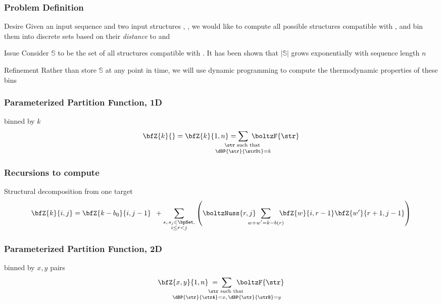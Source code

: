 \documentclass{beamer}
\begin{document}
\begin{frame}
	\frametitle{Problem Definition}
	\begin{block}
		{Desire} Given an input sequence \seq and two input structures \strA, \strB, we would like to compute \alert{all} possible structures \strS compatible with \seq, and bin them into discrete sets based on their {\em distance} to \strA and \strB
	\end{block}
	\begin{alertblock}
		{Issue} Consider $\mathbb{S}$ to be the set of all structures compatible with \seq. It has been shown that $|\mathbb{S}|$ grows exponentially with sequence length $n$
	\end{alertblock}
	\begin{block}
		{Refinement} Rather than store $\mathbb{S}$ at any point in time, we will use dynamic programming to compute the thermodynamic properties of these bins
	\end{block}
\end{frame}

\begin{frame}
	\frametitle{Parameterized Partition Function, 1D}
	\begin{block}
		{\bfZ{}{} binned by $k$}
		\begin{align*}
			\bfZ{k}{} = \bfZ{k}{1,n} = \sum_{\mathclap{\substack{\str \text{ such that }\rule[-.5ex]{0pt}{0pt} \\
			\dBP{\str}{\strSt}=k}}}\; \boltzF{\str}
		\end{align*}
	\end{block}
\end{frame}

\begin{frame}
	\frametitle{Recursions to compute \bfZ{k}{i,j}}
	\begin{block}
		{Structural decomposition from one target}
		\begin{align*}
			\bfZ{k}{i,j} = \bfZ{k-b_0}{i,j-1}\enspace + \sum_{\substack{s_r s_j \in \bpSet, \\
			i \le r<j}} \left( \boltzNuss{r,j}\enspace \sum_{\mathclap{w+w'=k-b(r)}}\quad \bfZ{w}{i,r-1} \bfZ{w'}{r+1,j-1} \right)
		\end{align*}
	\end{block}
\end{frame}

\begin{frame}
	\frametitle{Parameterized Partition Function, 2D}
	\begin{block}
		{\bfZ{}{} binned by $x,y$ pairs}
		\begin{align*}
			\bfZ{x,y}{1,n}\;=\; \sum_{\mathclap{\substack{ \str \text{ such that } \rule[-.5ex]{0pt}{0pt} \\
			\dBP{\str}{\strA} = x,\,\dBP{\str}{\strB} = y}}}\enspace \boltzF{\str}
		\end{align*}
	\end{block}
\end{frame}
\end{document}
